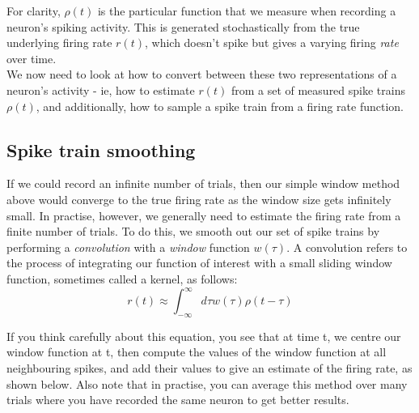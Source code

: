 \documentclass{article}
\begin{document}
For clarity, $\rho(t)$ is the particular function that we measure when recording a neuron's spiking activity. This is generated stochastically from the true underlying firing rate $r(t)$, which doesn't spike but gives a varying firing \textit{rate} over time.\\

We now need to look at how to convert between these two representations of a neuron's activity - ie, how to estimate $r(t)$ from a set of measured spike trains $\rho(t)$, and additionally, how to sample a spike train from a firing rate function.

\subsection{Spike train smoothing}

If we could record an infinite number of trials, then our simple window method above would converge to the true firing rate as the window size gets infinitely small. In practise, however, we generally need to estimate the firing rate from a finite number of trials. To do this, we smooth out our set of spike trains by performing a \textit{convolution} with a \textit{window} function $w(\tau)$. A convolution refers to the process of integrating our function of interest with a small sliding window function, sometimes called a kernel, as follows:\\

\begin{equation*}
    r(t) \approx \int_{- \infty}^{\infty} d\tau w(\tau) \rho(t-\tau)
\end{equation*}

If you think carefully about this equation, you see that at time t, we centre our window function at t, then compute the values of the window function at all neighbouring spikes, and add their values to give an estimate of the firing rate, as shown below. Also note that in practise, you can average this method over many trials where you have recorded the same neuron to get better results.\\
\end{document}
